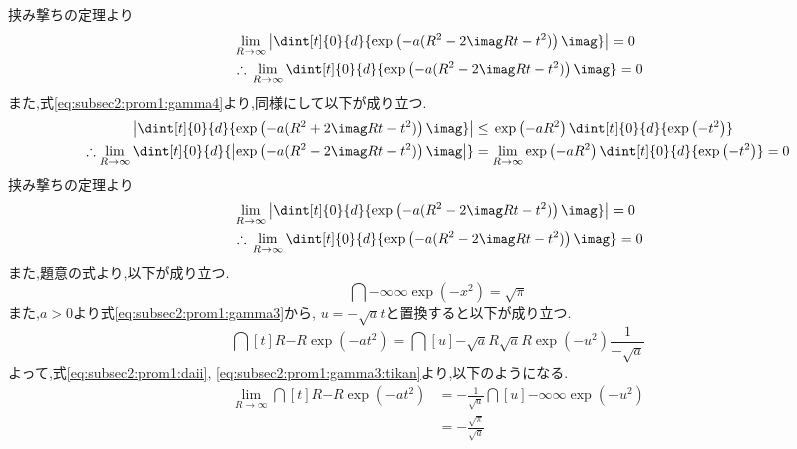 \documentclass[dvipdfmx,titlepage, 11pt, a4paper]{jsarticle}%
\begin{document}
\begin{enumerate}[(1)]
    挟み撃ちの定理より
    \begin{align}
        &\lim_{R \to \infty} \left\lvert \dint[t]{0}{d}{\exp\left(-a(R^2 - 2\imag Rt - t^2)\right)\imag}\right\rvert = 0\nonumber\\
        &\therefore\, \lim_{R \to \infty} \dint[t]{0}{d}{\exp\left(-a(R^2 - 2\imag Rt - t^2)\right)\imag} = 0\label{eq:subsec2:prom1:gamma2:kyokugen}
    \end{align}
    また,式\eqref{eq:subsec2:prom1:gamma4}より,同様にして以下が成り立つ.
    \begin{align*}
        \left\lvert \dint[t]{0}{d}{\exp\left(-a(R^2 + 2\imag Rt - t^2)\right)\imag}\right\rvert
        &\leq \, \exp\left(-aR^2\right)\dint[t]{0}{d}{\exp\left(- t^2\right)}\\
        \therefore \lim_{R \to \infty} \dint[t]{0}{d}{\left\lvert\exp\left(-a(R^2 - 2\imag Rt - t^2)\right)\imag\right\rvert}
        &= \lim_{R \to \infty}\exp\left(-aR^2\right)\dint[t]{0}{d}{\exp\left(- t^2\right)} = 0
    \end{align*}
    挟み撃ちの定理より
    \begin{align}
        &\lim_{R \to \infty} \left\lvert \dint[t]{0}{d}{\exp\left(-a(R^2 - 2\imag Rt - t^2)\right)\imag}\right\rvert = 0\nonumber\\
        &\therefore\, \lim_{R \to \infty} \dint[t]{0}{d}{\exp\left(-a(R^2 - 2\imag Rt - t^2)\right)\imag} = 0\label{eq:subsec2:prom1:gamma4:kyokugen}
    \end{align}
    また,題意の式より,以下が成り立つ.
    \begin{equation}
        \dint{-\infty}{\infty}{\exp\left(-x^2\right)} = \sqrt{\pi}\label{eq:subsec2:prom1:daii}
    \end{equation}
    また,$a > 0$より式\eqref{eq:subsec2:prom1:gamma3}から,
    $u = -\sqrt{a}t$と置換すると以下が成り立つ.
    \begin{equation}
        \dint[t]{R}{-R}{\exp\left(-at^2\right)}
        = \dint[u]{-\sqrt{a}R}{\sqrt{a}R}{\exp\left(-u^2\right)\frac{1}{-\sqrt{a}}}\label{eq:subsec2:prom1:gamma3:tikan}
    \end{equation}
    よって,式\eqref{eq:subsec2:prom1:daii}, \eqref{eq:subsec2:prom1:gamma3:tikan}より,以下のようになる.
    \begin{align}
        \lim_{R \to \infty} \dint[t]{R}{-R}{\exp\left(-at^2\right)}
        &= -\frac{1}{\sqrt{a}}\dint[u]{-\infty}{\infty}{\exp\left(-u^2\right)}\nonumber\\
        &= -\frac{\sqrt{\pi}}{\sqrt{a}}\label{eq:subsec2:prom1:gamma3:ans}

\end{align}
\end{enumerate}
\end{document}
